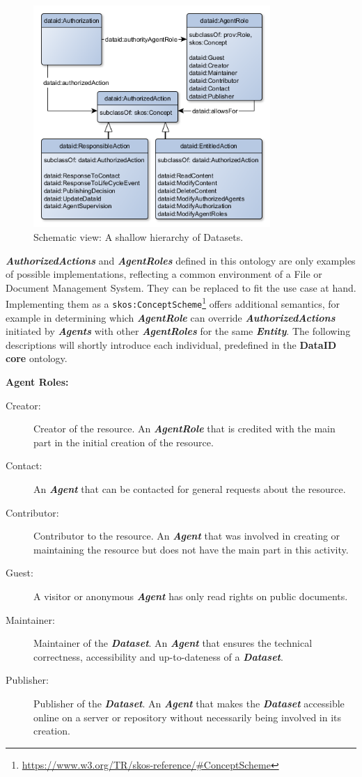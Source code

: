 \documentclass[a4paper,english,twoside,BCOR1.5cm,headsepline,DIV12,appendixprefix,final,12pt]{scrbook}
\newcommand{\core}{{\ttfamily\bfseries DataID core}\xspace}
\newcommand{\prop}[1]{{{\texttt{#1}}}}
\newcommand{\important}[1]{\textbf{\textit{#1}}}
\newcommand\footnoteurl[1]{\footnote{\scriptsize\url{#1}}}
\begin{document}
\begin{figure}[!htbp]
\centering
  \includegraphics[width=9cm]{images/ClassAuthorizedAction.png}
  \caption{Schematic view: A shallow hierarchy of Datasets.}
  \label{fig:example}
\end{figure}

\important{AuthorizedActions} and \important{AgentRoles} defined in this ontology are only examples of possible implementations, reflecting a common environment of a File or Document Management System. They can be replaced to fit the use case at hand. Implementing them as a \prop{skos:ConceptScheme}\footnoteurl{https://www.w3.org/TR/skos-reference/#ConceptScheme} offers additional semantics, for example in determining which \important{AgentRole} can override \important{AuthorizedActions} initiated by \important{Agents} with other \important{AgentRoles} for the same \important{Entity}. The following descriptions will shortly introduce each individual, predefined in the \core ontology.

{\large\textbf{Agent Roles:}}
\begin{description}
\item[Creator:] Creator of the resource. An \important{AgentRole} that is credited with the main part in the initial creation of the resource.
\item[Contact:] An \important{Agent} that can be contacted for general requests about the resource.
\item[Contributor:] Contributor to the resource. An \important{Agent} that was involved in creating or maintaining the resource but does not have the main part in this activity.
\item[Guest:] A visitor or anonymous \important{Agent} has only read rights on public documents.
\item[Maintainer:] Maintainer of the \important{Dataset}. An \important{Agent} that ensures the technical correctness, accessibility and up-to-dateness of a \important{Dataset}.
\item[Publisher:] Publisher of the \important{Dataset}. An \important{Agent} that makes the \important{Dataset} accessible online on a server or repository without necessarily being involved in its creation.\\
\end{description}
\end{document}
